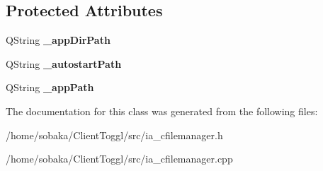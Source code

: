 \subsection*{Protected Attributes}
\begin{DoxyCompactItemize}
\item 
\mbox{\label{classIA__CFileManager_af6057e2a532f52aacafe76e142688ba3}} 
Q\+String {\bfseries \+\_\+app\+Dir\+Path}
\item 
\mbox{\label{classIA__CFileManager_a242611a3374be4b4b4a624c12ae4ecc7}} 
Q\+String {\bfseries \+\_\+autostart\+Path}
\item 
\mbox{\label{classIA__CFileManager_ad29ab7c2189882c673ebc2fa2dce72c5}} 
Q\+String {\bfseries \+\_\+app\+Path}
\end{DoxyCompactItemize}


The documentation for this class was generated from the following files\+:\begin{DoxyCompactItemize}
\item 
/home/sobaka/\+Client\+Toggl/src/ia\+\_\+cfilemanager.\+h\item 
/home/sobaka/\+Client\+Toggl/src/ia\+\_\+cfilemanager.\+cpp\end{DoxyCompactItemize}
